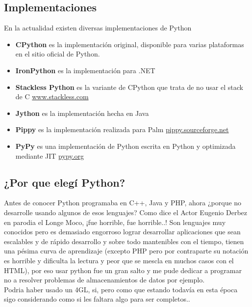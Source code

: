 \subsection{Implementaciones}

En la actualidad existen diversas implementaciones de Python

\begin{itemize}
    \item {\bfseries CPython} es la implementación original, disponible para varias plataformas en el sitio oficial de Python.
    \item {\bfseries IronPython} es la implementación para .NET
    \item {\bfseries Stackless Python} es la variante de CPython que trata de no usar el stack de C  \url{www.stackless.com}
    \item {\bfseries Jython} es la implementación hecha en Java
    \item {\bfseries Pippy} es la implementación realizada para Palm \url{pippy.sourceforge.net}
    \item {\bfseries PyPy} es una implementación de Python escrita en Python y optimizada mediante JIT \url{pypy.org}
\end{itemize}

\subsection{¿Por que elegí Python?}

Antes de conocer Python programaba en C++, Java y PHP, ahora ¿porque no desarrolle usando algunos de esos lenguajes? Como dice el Actor Eugenio Derbez en parodia el Longe Moco, ¡fue horrible, fue horrible..! Son lenguajes muy conocidos pero es demasiado engorroso lograr desarrollar aplicaciones que sean escalables y de rápido desarrollo y sobre todo mantenibles con el tiempo, tienen una pésima curva de aprendizaje (excepto PHP pero por contraparte su notación es horrible y dificulta la lectura y peor que se mescla en muchos casos con el HTML), por eso usar python fue un gran salto y me pude dedicar a programar no a resolver problemas de almacenamientos de datos por ejemplo.\\

Podria haber usado  un 4GL, si, pero como que estando todavía en esta época sigo considerando como si les faltara algo para ser completos..




